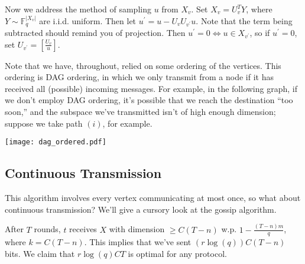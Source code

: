 \documentclass[11pt]{article}
\newcommand{\F}{\mathbb{F}}
\begin{document}
Now we address the method of sampling $u$ from $X_v$. Set $X_v = U_v^TY$, where $Y \sim \F_q^{|X_v|}$ are
i.i.d. uniform. Then let $u^\prime = u - U_vU_{v^\prime}u$. Note that the term being subtracted should
remind you of projection. Then $u^\prime = 0 \iff u \in X_{v^\prime}$, so if $u^\prime = 0$, set
$U_{v^\prime} = \left[\frac{U_v}{u}\right]$.

Note that we have, throughout, relied on some ordering of the vertices. This ordering is DAG ordering,
in which we only transmit from a node if it has received all (possible) incoming messages. For example,
in the following graph, if we don't employ DAG ordering, it's possible that we reach the destination
``too soon,'' and the subspace we've transmitted isn't of high enough dimension; suppose we take path
$(i)$, for example.

\begin{center}
\texttt{[image: dag\_ordered.pdf]}
\end{center}

\subsection{Continuous Transmission}

This algorithm involves every vertex communicating at most once, so what about continuous transmission?
We'll give a cursory look at the gossip algorithm.

After $T$ rounds, $t$ receives $X$ with dimension $\geq C(T-n)$ w.p. $1 - \frac{(T - n)m}{q}$,
where $k = C(T-n)$. This implies that we've sent $(r\log(q))C(T-n)$ bits. We claim that $r\log(q)
CT$ is optimal for any protocol.
\end{document}
